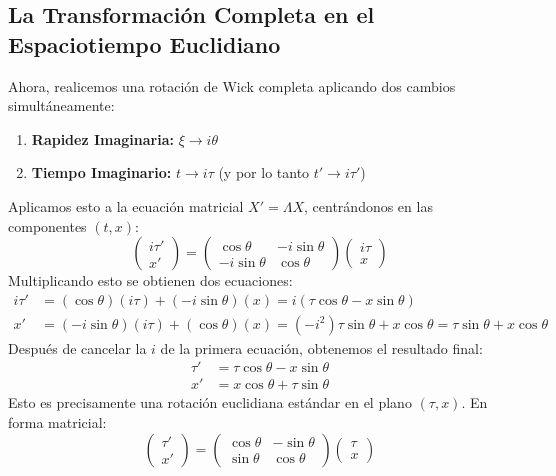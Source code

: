 \documentclass[11pt,a4paper]{article}
\begin{document}
\subsection{La Transformación Completa en el Espaciotiempo Euclidiano}
Ahora, realicemos una rotación de Wick completa aplicando dos cambios simultáneamente:
\begin{enumerate}
    \item \textbf{Rapidez Imaginaria:} $\xi \to i\theta$
    \item \textbf{Tiempo Imaginario:} $t \to i\tau$ (y por lo tanto $t' \to i\tau'$)
\end{enumerate}
Aplicamos esto a la ecuación matricial $X'=\Lambda X$, centrándonos en las componentes $(t,x)$:
\[ \begin{pmatrix} i\tau' \\ x' \end{pmatrix} = \begin{pmatrix} \cos\theta & -i\sin\theta \\ -i\sin\theta & \cos\theta \end{pmatrix} \begin{pmatrix} i\tau \\ x \end{pmatrix} \]
Multiplicando esto se obtienen dos ecuaciones:
\begin{align*}
    i\tau' &= (\cos\theta)(i\tau) + (-i\sin\theta)(x) = i(\tau\cos\theta - x\sin\theta) \\
    x' &= (-i\sin\theta)(i\tau) + (\cos\theta)(x) = (-i^2)\tau\sin\theta + x\cos\theta = \tau\sin\theta + x\cos\theta
\end{align*}
Después de cancelar la $i$ de la primera ecuación, obtenemos el resultado final:
\[
\begin{aligned}
\tau' &= \tau\cos\theta - x\sin\theta \\
x' &= x\cos\theta + \tau\sin\theta
\end{aligned}
\]
Esto es precisamente una rotación euclidiana estándar en el plano $(\tau, x)$. En forma matricial:
\[
\boxed{
\begin{pmatrix} \tau' \\ x' \end{pmatrix} = \begin{pmatrix} \cos\theta & -\sin\theta \\ \sin\theta & \cos\theta \end{pmatrix} \begin{pmatrix} \tau \\ x \end{pmatrix}
}
\]
\end{document}
